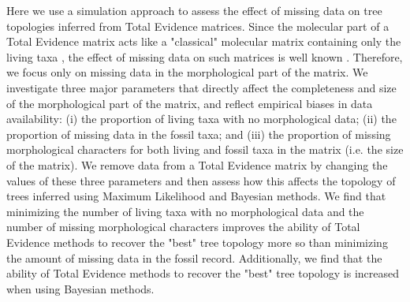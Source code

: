 \documentclass[12pt,letterpaper]{article}
\begin{document}
Here we use a simulation approach to assess the effect of missing data on tree topologies inferred from Total Evidence matrices. Since the molecular part of a Total Evidence matrix acts like a "classical" molecular matrix containing only the living taxa \citep{ronquista2012}, the effect of missing data on such matrices is well known \citep{wiensmissing2006,wiensmissing2008,lemmonthe2009,rouresite-specific2011}.
Therefore, we focus only on missing data in the morphological part of the matrix. We investigate three major parameters that directly affect the completeness and size of the morphological part of the matrix, and reflect empirical biases in data availability: (i) the proportion of living taxa with no morphological data; (ii) the proportion of missing data in the fossil taxa; and (iii) the proportion of missing morphological characters for both living and fossil taxa in the matrix (i.e. the size of the matrix).
We remove data from a Total Evidence matrix by changing the values of these three parameters and then assess how this affects the topology of trees inferred using Maximum Likelihood and Bayesian methods.
We find that minimizing the number of living taxa with no morphological data and the number of missing morphological characters improves the ability of Total Evidence methods to recover the "best" tree topology more so than minimizing the amount of missing data in the fossil record. Additionally, we find that the ability of Total Evidence methods to recover the "best" tree topology is increased when using Bayesian methods.
\end{document}
